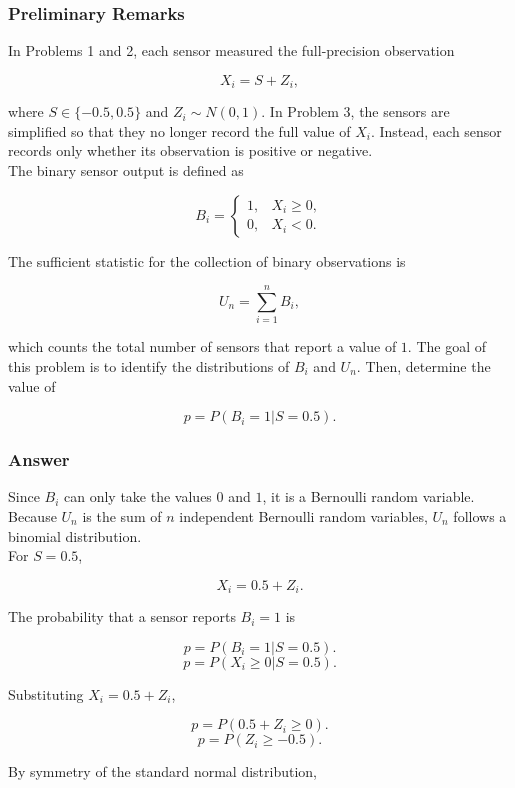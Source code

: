 \documentclass[12pt,a4paper]{article}
\begin{document}
\subsubsection{Preliminary Remarks}

In Problems 1 and 2, each sensor measured the full-precision observation

\[
X_i=S+Z_i,
\]

where \(S\in\{-0.5,0.5\}\) and \(Z_i\sim N(0,1)\). In Problem 3, the sensors are simplified so that they no longer record the full value of \(X_i\). Instead, each sensor records only whether its observation is positive or negative.\\

The binary sensor output is defined as

\[
B_i=
\begin{cases}
1, & X_i\geq 0,\\
0, & X_i<0.
\end{cases}
\]

The sufficient statistic for the collection of binary observations is

\[
U_n=\sum_{i=1}^{n} B_i,
\]

which counts the total number of sensors that report a value of \(1\). The goal of this problem is to identify the distributions of \(B_i\) and \(U_n\). Then, determine the value of

\[
p=P(B_i=1|S=0.5).
\]

\subsubsection{Answer}

Since \(B_i\) can only take the values \(0\) and \(1\), it is a Bernoulli random variable.\\

Because \(U_n\) is the sum of \(n\) independent Bernoulli random variables, \(U_n\) follows a binomial distribution.\\

For \(S=0.5\),

\[
X_i=0.5+Z_i.
\]

The probability that a sensor reports \(B_i=1\) is

\[
p=P(B_i=1|S=0.5).
\]
\[
p=P(X_i\geq 0|S=0.5).
\]

Substituting \(X_i=0.5+Z_i\),

\[
p=P(0.5+Z_i\geq 0).
\]
\[
p=P(Z_i\geq -0.5).
\]

By symmetry of the standard normal distribution,
\end{document}
